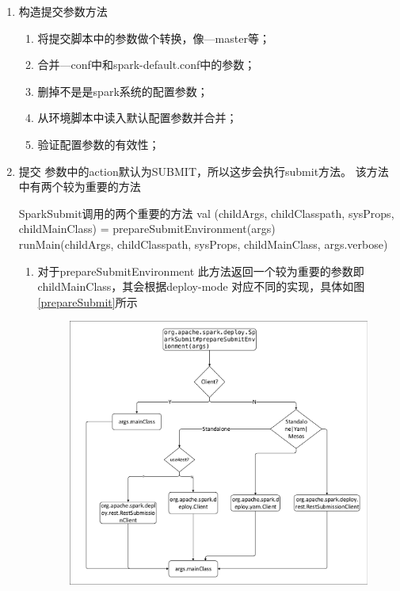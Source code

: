 \begin{enumerate}[\bfseries 1]
   \item 构造提交参数方法
       \begin{enumerate}
       	 \item 将提交脚本中的参数做个转换，像—master等；
       	 \item 合并—conf中和spark-default.conf中的参数；
       	 \item 删掉不是是spark系统的配置参数；
       	 \item 从环境脚本中读入默认配置参数并合并；
       	 \item 验证配置参数的有效性；
       \end{enumerate}
   \item 提交
   参数中的action默认为SUBMIT，所以这步会执行submit方法。
   该方法中有两个较为重要的方法
   \begin{centertitlebox}{SparkSubmit调用的两个重要的方法}
   	val (childArgs, childClasspath, sysProps, childMainClass) = prepareSubmitEnvironment(args)\\
   	runMain(childArgs, childClasspath, sysProps, childMainClass, args.verbose)
   \end{centertitlebox}
     \begin{enumerate}
     	\item 对于prepareSubmitEnvironment
     	此方法返回一个较为重要的参数即childMainClass，其会根据deploy-mode
     	对应不同的实现，具体如图\ref{prepareSubmit}所示
        	\begin{figure}[H] 
     		\centering
     		\includegraphics[scale=0.55]{figures/prepareSubmit.pdf}

\end{figure}
\end{enumerate}
\end{enumerate}
